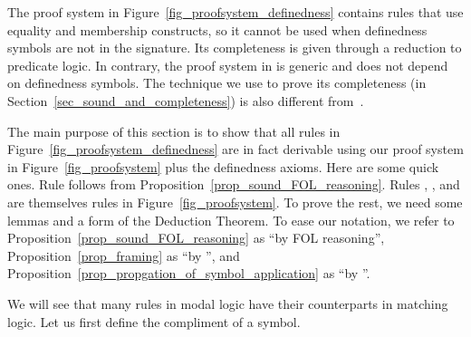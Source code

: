 \documentclass{amsart}
\begin{document}
\begin{comment}
We denote the provability relation of 
this proof system with definedness symbols as ``$\vdashd$''
to distinguish it from the one that we defined in 
Definition~\ref{def_proof}.
Formally, we have the next definition.

\begin{definition}
	\label{def_proofd}
	Let $\Gamma$ be a set of patterns containing all instances of the
	axiom schema $\forall x . \ceil{x}$ for definedness symbols.
	
	The set of all theorems deduced from $\Gamma$ is defined as
	the smallest set that contains $\Gamma$
	and is closed under the proof rules of the proof system.
	If $\varphi$ is in the set of all theorems deduced from $\Gamma$,
	we write $\Gamma \vdash \varphi$
	and say $\varphi$ is a theorem of $\Gamma$.
	When $\Gamma$ is the empty set, 
	we abbreviate $\emptyset \vdash \varphi$ as just
	$\vdash \varphi$.
\end{definition}
\end{comment}

The proof system in Figure~\ref{fig_proofsystem_definedness}
contains rules that use equality and membership constructs,
so it cannot be used when definedness symbols are not
in the signature.
Its completeness is given through a reduction to predicate logic.
In contrary, the proof system in 
is generic and does not depend on definedness symbols.
The technique we use to prove its completeness
(in Section~\ref{sec_sound_and_completeness})
is also different from~\cite{rosu-2017-lmcs}.

The main purpose of this section is to show that
all rules in Figure~\ref{fig_proofsystem_definedness}
are in fact derivable using our proof system
in Figure~\ref{fig_proofsystem} plus the definedness axioms.
Here are some quick ones.
Rule \propositionaltautology follows from
Proposition~\ref{prop_sound_FOL_reasoning}.
Rules \modusponens, \forallrule, and \universalgeneralization
are themselves rules in Figure~\ref{fig_proofsystem}.
To prove the rest,
we need some lemmas and a form of the Deduction Theorem.
To ease our notation, we refer to
Proposition~\ref{prop_sound_FOL_reasoning} as ``by FOL reasoning'',
Proposition~\ref{prop_framing} as ``by \eframing'',
and
Proposition~\ref{prop_propgation_of_symbol_application} as
``by \epropagation''.

We will see that many rules in modal logic have their
counterparts in matching logic.
Let us first define the compliment of a symbol.
\end{document}
